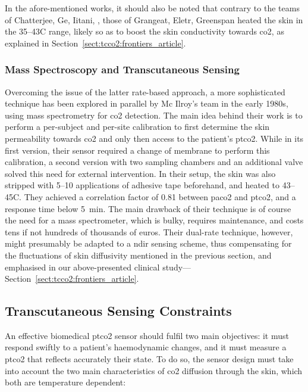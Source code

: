 In the afore-mentioned works, it should also be noted that contrary to the teams of Chatterjee, Ge, Iitani, \etal{}, those of Grangeat, Eletr, Greenspan \etal{} heated the skin in the 35--43{\degree}C range, likely so as to boost the skin conductivity towards \gls{co2}, as explained in Section~\ref{sect:tcco2:frontiers_article}.

\subsubsection{Mass Spectroscopy and Transcutaneous Sensing}

Overcoming the issue of the latter rate-based approach, a more sophisticated technique has been explored in parallel by Mc Ilroy's team in the early 1980s\cite{mcilroy1978, hansen1980, targett1984}, using mass spectrometry for \gls{co2} detection. The main idea behind their work is to perform a per-subject and per-site calibration to first determine the skin permeability towards \gls{co2} and only then access to the patient's \gls{ptco2}. While in its first version, their sensor required a change of membrane to perform this calibration\cite{hansen1980}, a second version with two sampling chambers and an additional valve solved this need for external intervention\cite{targett1984}. In their setup, the skin was also stripped with 5--10 applications of adhesive tape beforehand, and heated to 43--45{\degree}C. They achieved a correlation factor of 0.81 between \gls{paco2} and \gls{ptco2}, and a response time below 5~min. The main drawback of their technique is of course the need for a mass spectrometer, which is bulky, requires maintenance, and costs tens if not hundreds of thousands of euros. Their dual-rate technique, however, might presumably be adapted to a \gls{ndir} sensing scheme, thus compensating for the fluctuations of skin diffusivity mentioned in the previous section, and emphasised in our above-presented clinical study---Section~\ref{sect:tcco2:frontiers_article}.

\subsection{Transcutaneous Sensing Constraints}

An effective biomedical \gls{ptco2} sensor should fulfil two main objectives: it must respond swiftly to a patient's haemodynamic changes, and it must measure a \gls{ptco2} that reflects accurately their state. To do so, the sensor design must take into account the two main characteristics of \gls{co2} diffusion through the skin, which both are temperature dependent:

